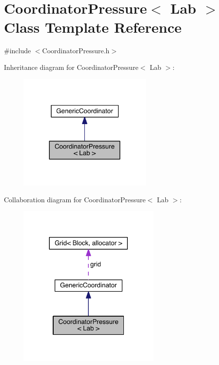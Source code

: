 \hypertarget{class_coordinator_pressure}{}\section{Coordinator\+Pressure$<$ Lab $>$ Class Template Reference}
\label{class_coordinator_pressure}


{\ttfamily \#include $<$Coordinator\+Pressure.\+h$>$}



Inheritance diagram for Coordinator\+Pressure$<$ Lab $>$\+:\nopagebreak
\begin{figure}[H]
\begin{center}
\leavevmode
\includegraphics[width=188pt]{db/d02/class_coordinator_pressure__inherit__graph}
\end{center}
\end{figure}


Collaboration diagram for Coordinator\+Pressure$<$ Lab $>$\+:\nopagebreak
\begin{figure}[H]
\begin{center}
\leavevmode
\includegraphics[width=200pt]{df/db9/class_coordinator_pressure__coll__graph}
\end{center}
\end{figure}
